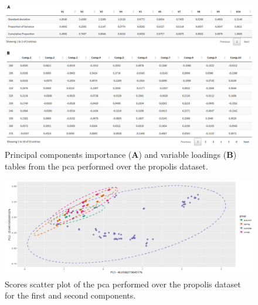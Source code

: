 \begin{figure}[h]
	\centering
	\includegraphics[width=1\linewidth]{Imagens/Propolis/pca}
	\caption{Principal components importance (\textbf{A}) and variable loadings (\textbf{B}) tables from the \gls{pca} performed over the propolis dataset.}
	\label{propolis_pca}
\end{figure}


\begin{figure}[h]
	\centering
	\includegraphics[width=1\linewidth]{Imagens/Propolis/pca_scores2D}
	\caption{Scores scatter plot of the \gls{pca} performed over the propolis dataset for the first and second components.}
	\label{propolis_pca_scores2D}
\end{figure}











